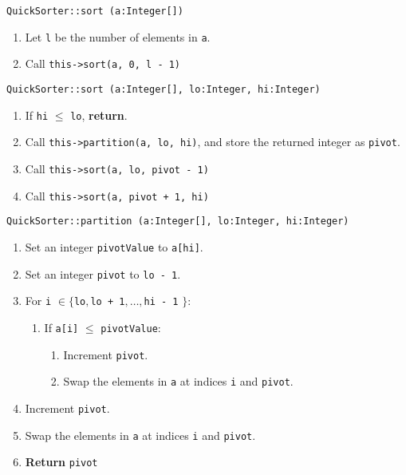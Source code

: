 \texttt{QuickSorter::sort (a:Integer[])}
\begin{enumerate}
	\item Let \texttt{l} be the number of elements in \texttt{a}.
	\item Call \texttt{this->sort(a, 0, l - 1)}
\end{enumerate}
\vspace{5mm}
\texttt{QuickSorter::sort (a:Integer[], lo:Integer, hi:Integer)}
\begin{enumerate}
	\item If \texttt{hi} $ \leq $ \texttt{lo}, \textbf{return}.
	\item Call \texttt{this->partition(a, lo, hi)}, and store the returned integer as \texttt{pivot}.
	\item Call \texttt{this->sort(a, lo, pivot - 1)}
	\item Call \texttt{this->sort(a, pivot + 1, hi)} 
\end{enumerate}
\vspace{5mm}
\texttt{QuickSorter::partition (a:Integer[], lo:Integer, hi:Integer)} 
\begin{enumerate}
	\item Set an integer \texttt{pivotValue} to \texttt{a[hi]}.
	\item Set an integer \texttt{pivot} to \texttt{lo - 1}.
	\item For \texttt{i} $ \in \{$\texttt{lo}$, $\texttt{lo + 1}$, \dots, $\texttt{hi - 1} $\}$:
	\begin{enumerate}
		\item If \texttt{a[i]} $ \leq $ \texttt{pivotValue}:
		\begin{enumerate}
			\item Increment \texttt{pivot}.
			\item Swap the elements in \texttt{a} at indices \texttt{i} and \texttt{pivot}.
		\end{enumerate}
	\end{enumerate}
	\item Increment \texttt{pivot}.
	\item Swap the elements in \texttt{a} at indices \texttt{i} and \texttt{pivot}.
	\item \textbf{Return} \texttt{pivot}
\end{enumerate}

\clearpage
\sourcecode






